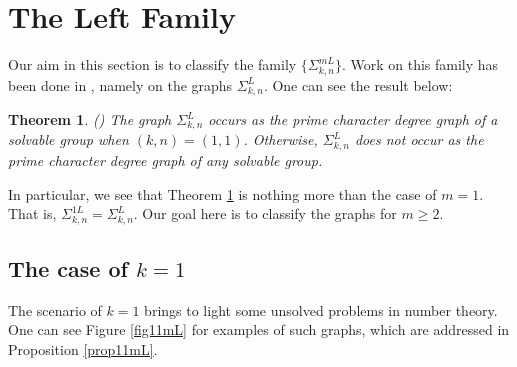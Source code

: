 \documentclass[11pt]{amsart}
\newtheorem{theorem}{Theorem}[section]
\theoremstyle{definition}
\theoremstyle{remark}
\numberwithin{equation}{section}
\newcommand{\SL}[2]{\Sigma_{#1,#2}^L} %
\newcommand{\SLi}[3]{\Sigma_{#1,#2}^{#3L}} %
\begin{document}
\section{The Left Family}\label{secleft}


Our aim in this section is to classify the family $\{\SLi{k}{n}{m}\}$. Work on this family has been done in \cite{LM}, namely on the graphs $\SL{k}{n}$. One can see the result below:

\begin{theorem}\label{Lfam}\emph{(\cite{LM})}
The graph $\SL{k}{n}$ occurs as the prime character degree graph of a solvable group when $(k,n)=(1,1)$. Otherwise, $\SL{k}{n}$ does not occur as the prime character degree graph of any solvable group.
\end{theorem}

In particular, we see that Theorem \ref{Lfam} is nothing more than the case of $m=1$. That is, $\SLi{k}{n}{1}=\SL{k}{n}$. Our goal here is to classify the graphs for $m\geq2$.

\subsection{The case of $k=1$}

The scenario of $k=1$ brings to light some unsolved problems in number theory. One can see Figure \ref{fig11mL} for examples of such graphs, which are addressed in Proposition \ref{prop11mL}.
\end{document}
